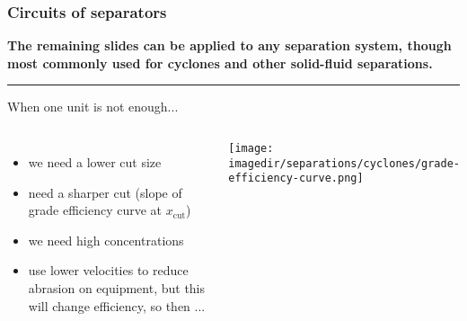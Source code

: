 \begin{comment}
\end{frame}

\begin{frame}\frametitle{how is it designed: simple nomographs, equations, etc}
	d50 design: C+R v6, p 423 and p 426 and 	p 450 C+R v6
\end{frame}

\begin{frame}\frametitle{Effect of solids flow rate}
	http://www.youtube.com/watch?v=BicR3JGlE5M
\end{frame}

\begin{frame}\frametitle{Circuit selection}
	Crushing circuit: to separate fines from coarse: recycle coarse material for recrushing. Could also use a screen. Why use a cyclone instead?
	Also: could use elutriation with air rather than screens or cyclones. Why would you use elutriation?

	Use: to clean dust from air; generally 5 \micron and larger
	Use: mists separated from gas
	U
	A cyclone is a centrifugal elutriator, although it is not usually so regarded. The cyclosizer is a series of inverted cyclones with added apex chambers through which water flows. Suspension is fed into the largest cyclone, and particles are separated into different size ranges.	
\end{frame}

\begin{frame}\frametitle{Circuits of cyclones}
	How is the flowsheet designed?
	Fig 6.15
	Fig 6.18
	\item Figre 6.19
\end{frame}
\end{comment}

\begin{frame}\frametitle{Circuits of separators}
	{\scriptsize \textbf{The remaining slides can be applied to any separation system, though most commonly used for cyclones and other solid-fluid separations.}}
	\vspace{12pt}
	\hrule
	\vspace{6pt}
	When one unit is not enough... 
	\begin{columns}[t]
			\begin{itemize}
				\item	we need a lower cut size
				\item	need a sharper cut (slope of grade efficiency curve at $x_\text{cut}$)
				\item	we need high concentrations
				\item	use lower velocities to reduce abrasion on equipment, but this will change efficiency, so then ...
			\end{itemize}
			\begin{center}
				\texttt{[image: \\imagedir/separations/cyclones/grade-efficiency-curve.png]}
			\end{center}
	\end{columns}	
	\vspace{24pt}
\end{frame}

